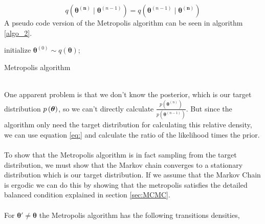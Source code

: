 \begin{equation*}
    q(\boldsymbol{\theta^{(n)}}\mid \boldsymbol{\theta}^{(n-1)})=q(\boldsymbol{\theta}^{(n-1)}\mid \boldsymbol{\theta^{(n)}})
\end{equation*}
A pseudo code version of the Metropolis algorithm can be seen in algorithm \ref{algo_2}.
\begin{algorithm}\label{algo_2}

\SetAlgoLined
initialize $\boldsymbol{\theta}^{(0)}\sim q(\boldsymbol{\theta})$;

\caption{Metropolis algorithm}
\end{algorithm}\\
One apparent problem is that we don't know the posterior, which is our target distribution $p\left (\boldsymbol{\theta}\right)$, so we can't directly calculate $\frac{p(\boldsymbol{\theta}^{(n)})}{p\left(\boldsymbol{\theta}^{(n-1)}\right)}$. But since the algorithm only need the target distribution for calculating this relative density, we can use equation \ref{eq:} and calculate the ratio of the likelihood times the prior. 
\\
\\
To show that the Metropolis algorithm is in fact sampling from the target distribution, we must show that the Markov chain converges to a stationary distribution which is our target distribution. If we assume that the Markov Chain is ergodic we can do this by showing that the metropolis satisfies the detailed balanced condition explained in section \ref{sec:MCMC}.\\
\\
For $\boldsymbol{\theta'}\neq \boldsymbol{\theta}$ the Metropolis algorithm has the following transitions densities,
